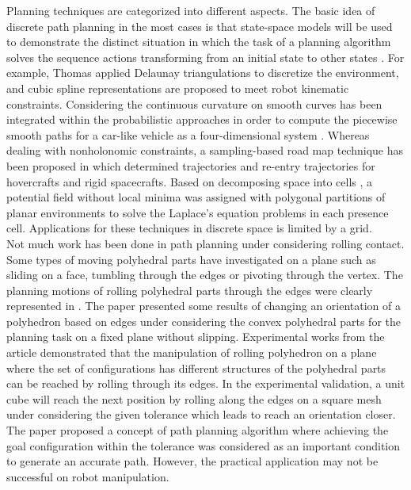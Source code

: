 \noindent Planning techniques are categorized into different aspects. The basic idea of discrete path planning in the most cases is that state-space models will be used to demonstrate the distinct situation in which the task of a planning algorithm solves the sequence actions transforming from an initial state to other states \cite{Lavalle98rapidly_exploringrandom}. For example, Thomas \cite{Thomas_2003_Trajectory} applied Delaunay triangulations to discretize the environment, and cubic spline representations are proposed to meet robot kinematic constraints. Considering the continuous curvature on smooth curves has been integrated within the probabilistic approaches in order to compute the piecewise smooth paths for a car-like vehicle as a four-dimensional system \cite{Lamiraux_2001_Smooth_MP}. Whereas dealing with nonholonomic constraints, a sampling-based road map technique has been proposed in \cite{Cheng01_RRT-BasedTrajectory} which determined trajectories and re-entry trajectories for hovercrafts and rigid spacecrafts. Based on decomposing space into cells \cite{Conner03_LocalFunction_Nagivation}, a potential field without local minima was assigned with polygonal partitions of planar environments to solve the Laplace’s equation problems in each presence cell. Applications for these techniques in discrete space is limited by a grid.\\

\noindent Not much work has been done in path planning under considering rolling contact. Some types of moving polyhedral parts have investigated on a plane such as sliding on a face, tumbling through the edges or pivoting \cite{Aiyama93_Pivoting} through the vertex. The planning motions of rolling polyhedral parts through the edges were clearly represented in \cite{Marigo97_PolyhedraManipulation_rolling}. The paper presented some results of changing an orientation of a polyhedron based on edges under considering the convex polyhedral parts for the planning task on a fixed plane without slipping. Experimental works from the article demonstrated that the manipulation of rolling polyhedron on a plane where the set of configurations has different structures of the polyhedral parts can be reached by rolling through its edges. In the experimental validation, a unit cube will reach the next position by rolling  along the edges on a square mesh under considering the given tolerance which leads to reach an orientation closer. The paper proposed a concept of path planning algorithm where achieving the goal configuration within the tolerance was considered as an important condition to generate an accurate path. However, the practical application may not be successful on robot manipulation.\\

